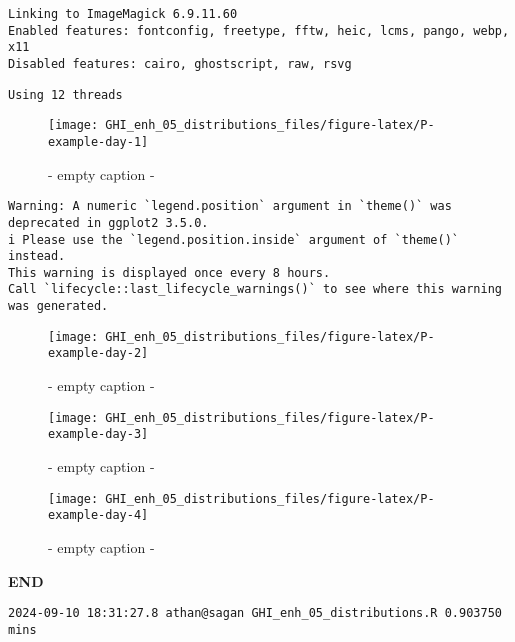 \documentclass[
  10pt,
  a4paper,oneside]{article}
\begin{document}
\begin{verbatim}
Linking to ImageMagick 6.9.11.60
Enabled features: fontconfig, freetype, fftw, heic, lcms, pango, webp, x11
Disabled features: cairo, ghostscript, raw, rsvg
\end{verbatim}

\begin{verbatim}
Using 12 threads
\end{verbatim}

\begin{figure}[H]

{\centering \texttt{[image: GHI\_enh\_05\_distributions\_files/figure-latex/P-example-day-1]} 

}

\caption{ - empty caption - }\label{fig:P-example-day-1}
\end{figure}

\begin{verbatim}
Warning: A numeric `legend.position` argument in `theme()` was deprecated in ggplot2 3.5.0.
i Please use the `legend.position.inside` argument of `theme()` instead.
This warning is displayed once every 8 hours.
Call `lifecycle::last_lifecycle_warnings()` to see where this warning was generated.
\end{verbatim}

\begin{figure}[H]

{\centering \texttt{[image: GHI\_enh\_05\_distributions\_files/figure-latex/P-example-day-2]} 

}

\caption{ - empty caption - }\label{fig:P-example-day-2}
\end{figure}
\begin{figure}[H]

{\centering \texttt{[image: GHI\_enh\_05\_distributions\_files/figure-latex/P-example-day-3]} 

}

\caption{ - empty caption - }\label{fig:P-example-day-3}
\end{figure}
\begin{figure}[H]

{\centering \texttt{[image: GHI\_enh\_05\_distributions\_files/figure-latex/P-example-day-4]} 

}

\caption{ - empty caption - }\label{fig:P-example-day-4}
\end{figure}

\textbf{END}

\begin{verbatim}
2024-09-10 18:31:27.8 athan@sagan GHI_enh_05_distributions.R 0.903750 mins
\end{verbatim}
\end{document}
